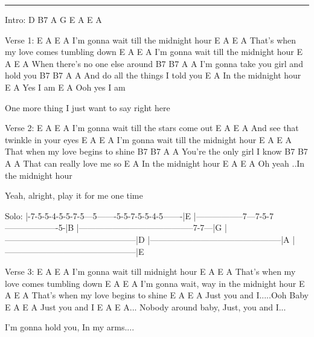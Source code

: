 \noindent\rule{\columnwidth}{1pt}

\begin{multicols}{2}
\begin{lstsong}
Intro:
D B7 A G
E A E A

Verse 1:
            E              A      E       A
I'm gonna wait till the midnight hour
                E          A         E    A   
That's when my love comes tumbling down
           E              A       E       A
I'm gonna wait till the midnight hour
             E       A        E       A
When there's no one else around
           B7       B7        A        A
I'm gonna take you girl and hold you
        B7       B7       A        A
And do all the things I told you
                     E    A
In the midnight hour
 E        A
Yes I am
     E         A
Ooh yes I am

One more thing I just want to say right here

Verse 2:
           E              A         E    A
I'm gonna wait till the stars come out
               E         A     E     A
And see that twinkle in your eyes
           E             A        E       A
I'm gonna wait till the midnight hour
             E        A       E       A
That when my love begins to shine
            B7    B7     A    A
You're the only girl I know
          B7     B7      A   A
That can really love me so
                      E   A
In the midnight hour
    E             A         E     A
Oh yeah ..In the midnight hour

Yeah, alright, play it for me one time
\end{lstsong}

\begin{lsttab}
Solo:
|-7-5-5-4-5-5-7-5---5-------5-5-7-5-5-4-5-------|E
|-----------------7---7-5-7-------------------5-|B
|-----------------------------------------7-7---|G
|-----------------------------------------------|D
|-----------------------------------------------|A
|-----------------------------------------------|E
\end{lsttab}

\begin{lstsong}
Verse 3:
           E          A        E     A
I'm gonna wait till midnight hour
                  E        A        E       A
That's when my love comes tumbling down
            E                A        E     A
I'm gonna wait, way in the midnight hour
                E      A        E       A
That's when my love begins to shine
      E      A  E      A
Just you and I.....Ooh Baby
     E       A   E   A
Just you and I 
    E          A           E      A...
Nobody around baby, Just, you and I...

I'm gonna hold you, In my arms....
\end{lstsong}
\end{multicols}
\newpage


